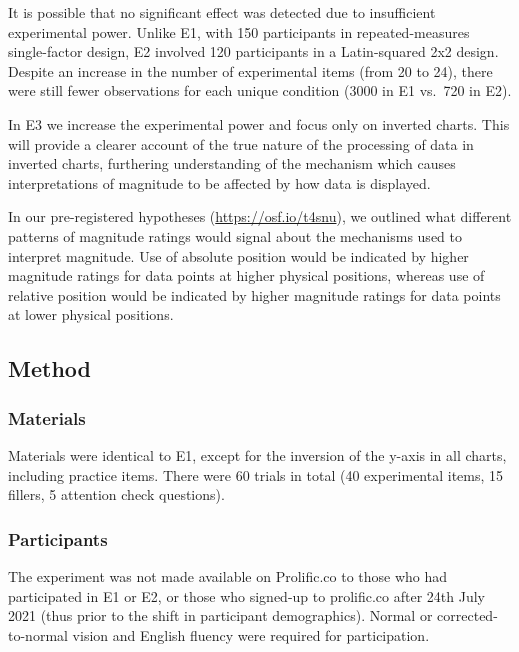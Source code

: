 \documentclass[journal]{vgtc}                %
\begin{document}
It is possible that no significant effect was detected due to insufficient experimental power. Unlike E1, with 150 participants in repeated-measures single-factor design, E2 involved 120 participants in a Latin-squared 2x2 design. Despite an increase in the number of experimental items (from 20 to 24), there were still fewer observations for each unique condition (3000 in E1 vs.~720 in E2).

In E3 we increase the experimental power and focus only on inverted charts. This will provide a clearer account of the true nature of the processing of data in inverted charts, furthering understanding of the mechanism which causes interpretations of magnitude to be affected by how data is displayed.

In our pre-registered hypotheses (\url{https://osf.io/t4snu}), we outlined what different patterns of magnitude ratings would signal about the mechanisms used to interpret magnitude. Use of absolute position would be indicated by higher magnitude ratings for data points at higher physical positions, whereas use of relative position would be indicated by higher magnitude ratings for data points at lower physical positions.

\hypertarget{method-1}{%
\subsection{Method}\label{method-1}}

\hypertarget{materials-2}{%
\subsubsection{Materials}\label{materials-2}}

Materials were identical to E1, except for the inversion of the y-axis in all charts, including practice items. There were 60 trials in total (40 experimental items, 15 fillers, 5 attention check questions).

\hypertarget{participants-2}{%
\subsubsection{Participants}\label{participants-2}}

The experiment was not made available on Prolific.co to those who had participated in E1 or E2, or those who signed-up to prolific.co after 24th July 2021 (thus prior to the shift in participant demographics). Normal or corrected-to-normal vision and English fluency were required for participation.
\end{document}
